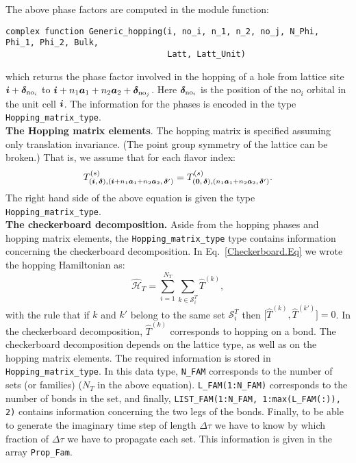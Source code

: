 The above phase factors are computed  in the   module function: 
\begin{lstlisting}[style=fortran]
complex function Generic_hopping(i, no_i, n_1, n_2, no_j, N_Phi, Phi_1, Phi_2, Bulk, 
                                 Latt, Latt_Unit)
\end{lstlisting}
which returns the  phase factor involved in the hopping of a hole from lattice site $ \boldsymbol{i} + \boldsymbol{\delta}_{\text{no}_i} $ to 
$\boldsymbol{i} + n_1 \boldsymbol{a}_1 + n_2 \boldsymbol{a}_2+ \boldsymbol{\delta}_{\text{no}_j}  $.  Here  $\boldsymbol{\delta}_{\text{no}_i}$  is  the position of the $\text{no}_i$  orbital in the unit cell
$\boldsymbol{i}$. 
The information for the phases is encoded in the type \texttt{Hopping\_matrix\_type}.\\

\noindent
\textbf{The  Hopping matrix elements}. 
The hopping matrix  is specified assuming only translation invariance.  (The point group symmetry of the lattice can be broken.)
That is, we assume that  for  each flavor index:
\begin{equation} 
T_{(\boldsymbol{i},\,\boldsymbol{\delta}), (\boldsymbol{i} +  n_1\boldsymbol{a}_1  + n_2 \boldsymbol{a}_2,\,\boldsymbol{\delta}')}^{(s)}   =   T^{(s)}_{(\boldsymbol{0},\,\boldsymbol{\delta}),  (n_1\boldsymbol{a}_1  + n_2 \boldsymbol{a}_2,\,\boldsymbol{\delta}') }.
\label{eq:hop}	 
\end{equation}
The right  hand side of the above equation is given  the type  \texttt{Hopping\_matrix\_type}.\\


\noindent
\textbf{The checkerboard decomposition.}   Aside from the hopping phases and hopping matrix elements, the \texttt{Hopping\_matrix\_type} type contains information  concerning the checkerboard   decomposition.  In Eq.~\eqref{Checkerboard.Eq} we wrote the hopping Hamiltonian as:
\begin{equation}
\hat{\mathcal{H}}_{T}     = \sum_{i=1}^{N_T} \sum_{k \in \mathcal{S}^{T}_i} \hat{T}^{(k)},  
\end{equation}
with the rule that  if $k$ and $k'$  belong to the same set $\mathcal{S}^{T}_i $ then   $ \big[ \hat{T}^{(k)} , \hat{T}^{(k')} \big] = 0 $.  In the checkerboard decomposition, $\hat{T}^{(k)}$   corresponds to  hopping on a bond.    The checkerboard decomposition depends on the   lattice type, as well as on the hopping matrix elements.   The required  information is stored in  \texttt{Hopping\_matrix\_type}. In this data type,  \texttt{N\_FAM}  corresponds to the number of sets  (or families) ($N_T$ in the above equation). \texttt{L\_FAM(1:N\_FAM)}   corresponds to the number of bonds in the set,  and finally,  \texttt{LIST\_FAM(1:N\_FAM, 1:max(L\_FAM(:)), 2)}    contains  information concerning the two legs of the bonds.
Finally, to be able to generate  the imaginary time step of length $\Delta \tau$  we  have to know   by which fraction of  $\Delta \tau$   we have to propagate each set.  This information is given in  the array  \texttt{Prop\_Fam}.  

